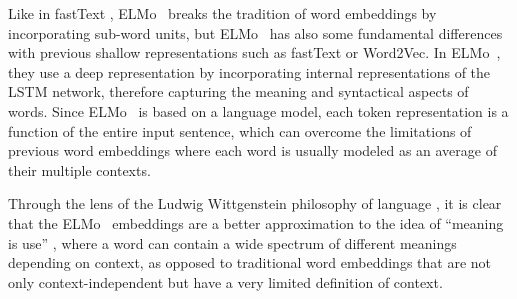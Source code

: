 \documentclass{article}
\begin{document}
Like in fastText \cite{bojanowski2016enriching}, ELMo~\cite{peters2018deep} breaks the tradition of word embeddings by incorporating sub-word units, but ELMo~\cite{peters2018deep} has also some fundamental differences with previous shallow representations such as fastText or Word2Vec. In ELMo~\cite{peters2018deep}, they use a deep representation by incorporating internal representations of the LSTM network, therefore capturing the meaning and syntactical aspects of words. Since ELMo~\cite{peters2018deep} is based on a language model, each token representation is a function of the entire input sentence, which can overcome the limitations of previous word embeddings where each word is usually modeled as an average of their multiple contexts.

Through the lens of the Ludwig Wittgenstein philosophy of language \cite{wittgenstein1953philosophical}, it is clear that the ELMo~\cite{peters2018deep} embeddings are a better approximation to the idea of ``meaning is use'' \cite{wittgenstein1953philosophical}, where a word can contain a wide spectrum of different meanings depending on context, as opposed to traditional word embeddings that are not only context-independent but have a very limited definition of context.
\end{document}

